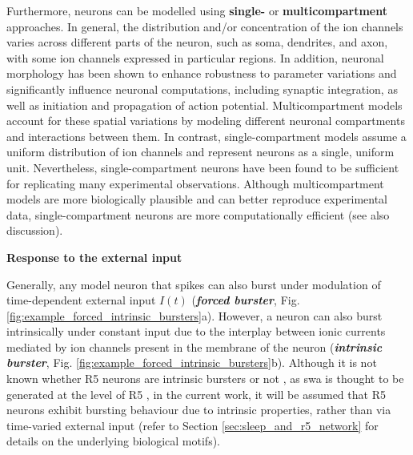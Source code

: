 \documentclass[../main.tex]{subfiles}
\begin{document}
Furthermore, neurons can be modelled using \textbf{single-} or \textbf{multicompartment} approaches.
In general, the distribution and/or concentration of the ion channels varies across different parts of the neuron, such as soma, dendrites, and axon, with some ion channels expressed in particular regions. 
In addition, neuronal morphology has been shown to enhance robustness to parameter variations and significantly influence neuronal computations, including synaptic integration, as well as initiation and propagation of action potential.
Multicompartment models account for these spatial variations by modeling different neuronal compartments and interactions between them. In contrast, single-compartment models assume a uniform distribution of ion channels and represent neurons as a single, uniform unit. Nevertheless, single-compartment neurons have been found to be sufficient for replicating many experimental observations.
Although multicompartment models are more biologically plausible and can better reproduce experimental data, single-compartment neurons are more computationally efficient (see also discussion).


\vspace*{0.3cm}
\noindent\textbf{Response to the external input}

Generally, any model neuron that spikes can also burst under modulation of
time-dependent external input $I(t)$ \parencite{izhikevichDynamicalSystemsNeuroscience2006}
(\textbf{\textit{forced burster}}, Fig. \ref{fig:example_forced_intrinsic_bursters}a).
However, a neuron can also burst intrinsically under constant input due to the interplay
between ionic currents mediated by ion channels present in the membrane of the neuron
(\textbf{\textit{intrinsic burster}}, Fig. \ref{fig:example_forced_intrinsic_bursters}b).
Although it is not known whether R5 neurons are intrinsic bursters or not
\parencite{raccugliaNetworkSpecificSynchronizationElectrical2019}, as \gls{swa}
is thought to be generated at the level of R5 \parencite{raccugliaNetworkSpecificSynchronizationElectrical2019},
in the current work, it will be assumed that R5 neurons exhibit bursting behaviour
due to intrinsic properties, rather than via time-varied external input (refer to Section \ref{sec:sleep_and_r5_network} for details on the underlying biological motifs).
\end{document}
